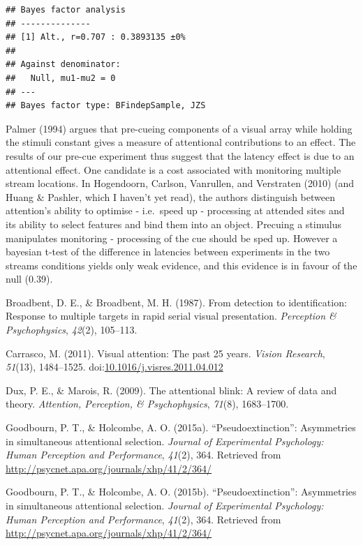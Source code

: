 \documentclass[,man]{apa6}
\theoremstyle{definition}
\theoremstyle{definition}
\theoremstyle{definition}
\theoremstyle{remark}
\begin{document}
\begin{verbatim}
## Bayes factor analysis
## --------------
## [1] Alt., r=0.707 : 0.3893135 ±0%
## 
## Against denominator:
##   Null, mu1-mu2 = 0 
## ---
## Bayes factor type: BFindepSample, JZS
\end{verbatim}

Palmer (1994) argues that pre-cueing components of a visual array while
holding the stimuli constant gives a measure of attentional
contributions to an effect. The results of our pre-cue experiment thus
suggest that the latency effect is due to an attentional effect. One
candidate is a cost associated with monitoring multiple stream
locations. In Hogendoorn, Carlson, Vanrullen, and Verstraten (2010) (and
Huang \& Pashler, which I haven't yet read), the authors distinguish
between attention's ability to optimise - i.e.~speed up - processing at
attended sites and its ability to select features and bind them into an
object. Precuing a stimulus manipulates monitoring - processing of the
cue should be sped up. However a bayesian t-test of the difference in
latencies between experiments in the two streams conditions yields only
weak evidence, and this evidence is in favour of the null (0.39).

\hypertarget{refs}{}
\hypertarget{ref-broadbent_detection_1987}{}
Broadbent, D. E., \& Broadbent, M. H. (1987). From detection to
identification: Response to multiple targets in rapid serial visual
presentation. \emph{Perception \& Psychophysics}, \emph{42}(2),
105--113.

\hypertarget{ref-carrasco_visual_2011}{}
Carrasco, M. (2011). Visual attention: The past 25 years. \emph{Vision
Research}, \emph{51}(13), 1484--1525.
doi:\href{https://doi.org/10.1016/j.visres.2011.04.012}{10.1016/j.visres.2011.04.012}

\hypertarget{ref-dux_attentional_2009}{}
Dux, P. E., \& Marois, R. (2009). The attentional blink: A review of
data and theory. \emph{Attention, Perception, \& Psychophysics},
\emph{71}(8), 1683--1700.

\hypertarget{ref-goodbourn_pseudoextinction_2015}{}
Goodbourn, P. T., \& Holcombe, A. O. (2015a). ``Pseudoextinction'':
Asymmetries in simultaneous attentional selection. \emph{Journal of
Experimental Psychology: Human Perception and Performance},
\emph{41}(2), 364. Retrieved from
\url{http://psycnet.apa.org/journals/xhp/41/2/364/}

\hypertarget{ref-goodbourn_pseudoextinction}{}
Goodbourn, P. T., \& Holcombe, A. O. (2015b). ``Pseudoextinction'':
Asymmetries in simultaneous attentional selection. \emph{Journal of
Experimental Psychology: Human Perception and Performance},
\emph{41}(2), 364. Retrieved from
\url{http://psycnet.apa.org/journals/xhp/41/2/364/}
\end{document}

